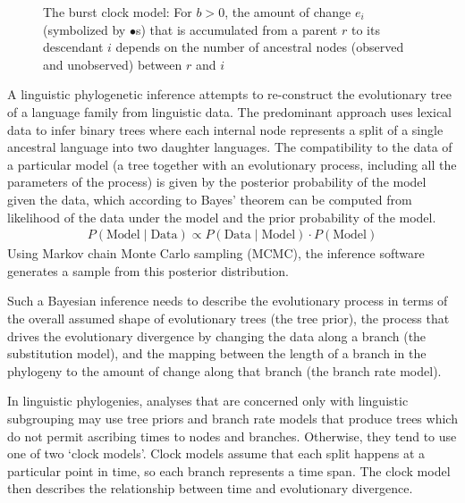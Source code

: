 \documentclass[]{rsos}%
\begin{document}
\begin{figure}
    \caption{The burst clock model: For $b>0$, the amount of change $e_i$ (symbolized
      by $\bullet$s) that is
      accumulated from a parent $r$ to its descendant $i$ depends on the number of
      ancestral nodes (observed and unobserved) between $r$ and $i$}
    \label{f:burstclock}
\end{figure}
A linguistic phylogenetic inference attempts to re-construct the evolutionary
tree of a language family from linguistic data. The predominant approach uses
lexical data to infer binary trees where each internal node represents a split
of a single ancestral language into two daughter languages. The compatibility to the data
of a particular model (a tree together with an evolutionary process, including
all the parameters of the process) is given by the posterior probability of the
model given the data, which according to Bayes' theorem can be computed from
likelihood of the data under the model and the prior probability of the model.
\begin{align}
    P(\text{Model}\mid\text{Data}) \propto P(\text{Data}\mid\text{Model}) \cdot P(\text{Model})
\end{align}
Using Markov chain Monte Carlo sampling (MCMC), the inference software generates
a sample from this posterior distribution.

Such a Bayesian inference needs to describe the evolutionary process in terms of
the overall assumed shape of evolutionary trees (the tree prior), the process
that drives the evolutionary divergence by changing the data along a branch (the
substitution model), and the mapping between the length of a branch in the
phylogeny to the amount of change along that branch (the branch rate model).

In linguistic phylogenies, analyses that are concerned only with linguistic
subgrouping may use tree priors and branch rate models that produce
trees which do not permit ascribing times to nodes and
branches. Otherwise, they tend to use one of two ‘clock models’. Clock models
assume that each split happens at a particular point in time, so each branch
represents a time span. The clock model then describes the relationship between time and
evolutionary divergence.
\end{document}
